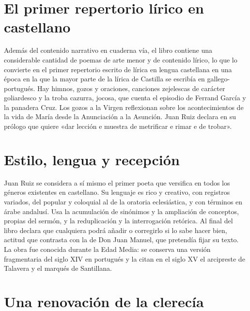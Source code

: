 \documentclass{book}
\begin{document}

\section{El primer repertorio lírico en castellano}

Además del contenido narrativo en cuaderna vía, el libro contiene una considerable cantidad de poemas de arte menor y de contenido lírico, lo que lo convierte en el primer repertorio escrito de lírica en lengua castellana en una época en la que la mayor parte de la lírica de Castilla se escribía en gallego-portugués. Hay himnos, gozos y oraciones, canciones zejelescas de carácter goliardesco y la troba cazurra, jocosa, que cuenta el episodio de Ferrand García y la panadera Cruz. Los gozos a la Virgen reflexionan sobre los acontecimientos de la vida de María desde la Anunciación a la Asunción. Juan Ruiz declara en su prólogo que quiere «dar lección e muestra de metrificar e rimar e de trobar».


\section{Estilo, lengua y recepción}

Juan Ruiz se considera a sí mismo el primer poeta que versifica en todos los géneros existentes en castellano. Su lenguaje es rico y creativo, con registros variados, del popular y coloquial al de la oratoria eclesiástica, y con términos en árabe andalusí. Usa la acumulación de sinónimos y la ampliación de conceptos, propias del sermón, y la reduplicación y la interrogación retórica. Al final del libro declara que cualquiera podrá añadir o corregirlo si lo sabe hacer bien, actitud que contrasta con la de Don Juan Manuel, que pretendía fijar su texto. La obra fue conocida durante la Edad Media: se conserva una versión fragmentaria del siglo XIV en portugués y la citan en el siglo XV el arcipreste de Talavera y el marqués de Santillana.


\section{Una renovación de la clerecía}
\end{document}
